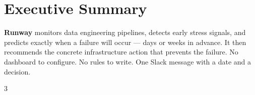 
\section{Executive Summary}

\begin{insight}
\textbf{Runway} monitors data engineering pipelines, detects early stress signals, and predicts
exactly when a failure will occur — days or weeks in advance. It then recommends the concrete
infrastructure action that prevents the failure. No dashboard to configure. No rules to write.
One Slack message with a date and a decision.
\end{insight}

\vspace{6pt}

\begin{multicols}{3}
\columnbreak
{}
\columnbreak
{}
\end{multicols}
